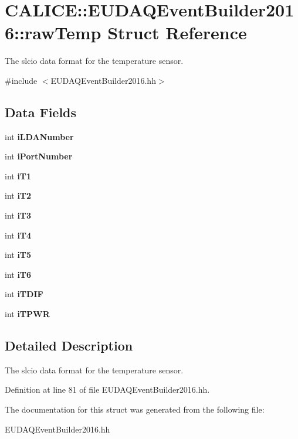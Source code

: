 \section{CALICE::EUDAQEventBuilder2016::rawTemp Struct Reference}
\label{structCALICE_1_1EUDAQEventBuilder2016_1_1rawTemp}


The slcio data format for the temperature sensor.  


{\ttfamily \#include $<$EUDAQEventBuilder2016.hh$>$}\subsection*{Data Fields}
\begin{DoxyCompactItemize}
\item 
int {\bfseries iLDANumber}\label{structCALICE_1_1EUDAQEventBuilder2016_1_1rawTemp_a8460e838e665925e751ac255c744bc0a}

\item 
int {\bfseries iPortNumber}\label{structCALICE_1_1EUDAQEventBuilder2016_1_1rawTemp_a893a863598b195242568606ebe69b543}

\item 
int {\bfseries iT1}\label{structCALICE_1_1EUDAQEventBuilder2016_1_1rawTemp_aa7a72a5bbf4f992a5558d6368c96f731}

\item 
int {\bfseries iT2}\label{structCALICE_1_1EUDAQEventBuilder2016_1_1rawTemp_a22341d30c99d5d97e8046bde0d5458cb}

\item 
int {\bfseries iT3}\label{structCALICE_1_1EUDAQEventBuilder2016_1_1rawTemp_a102d2b209d984708ebee772ba24de15f}

\item 
int {\bfseries iT4}\label{structCALICE_1_1EUDAQEventBuilder2016_1_1rawTemp_aa442935cfa5afd05e0f9492cb9adf4e3}

\item 
int {\bfseries iT5}\label{structCALICE_1_1EUDAQEventBuilder2016_1_1rawTemp_af7bd06eb8a0bfa231b5d08ac1643c2c0}

\item 
int {\bfseries iT6}\label{structCALICE_1_1EUDAQEventBuilder2016_1_1rawTemp_a4e4209cbdda7e021e924a11ddea24720}

\item 
int {\bfseries iTDIF}\label{structCALICE_1_1EUDAQEventBuilder2016_1_1rawTemp_ac9a9a22adb2b263f941c122ee84c77f5}

\item 
int {\bfseries iTPWR}\label{structCALICE_1_1EUDAQEventBuilder2016_1_1rawTemp_a57d652e2a7bdbcb88819aa7a2aa7c04c}

\end{DoxyCompactItemize}


\subsection{Detailed Description}
The slcio data format for the temperature sensor. 

Definition at line 81 of file EUDAQEventBuilder2016.hh.

The documentation for this struct was generated from the following file:\begin{DoxyCompactItemize}
\item 
EUDAQEventBuilder2016.hh\end{DoxyCompactItemize}
